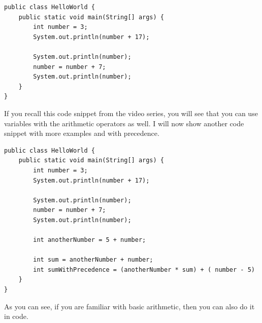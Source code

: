 \documentclass[11]{article}
\begin{document}
\begin{lstlisting}
public class HelloWorld {
    public static void main(String[] args) {
        int number = 3;
        System.out.println(number + 17);

        System.out.println(number);
        number = number + 7;
        System.out.println(number);
    }
}

\end{lstlisting}

If you recall this code snippet from the video series, you will see that you can use variables with the arithmetic operators as well. I will now show another code snippet with more examples and with precedence.

\begin{lstlisting}
public class HelloWorld {
    public static void main(String[] args) {
        int number = 3;
        System.out.println(number + 17);

        System.out.println(number);
        number = number + 7;
        System.out.println(number);
        
        int anotherNumber = 5 + number;
        
        int sum = anotherNumber + number;
        int sumWithPrecedence = (anotherNumber * sum) + ( number - 5)
    }
}

\end{lstlisting}
As you can see, if you are familiar with basic arithmetic, then you can also do it in code.
\end{document}

